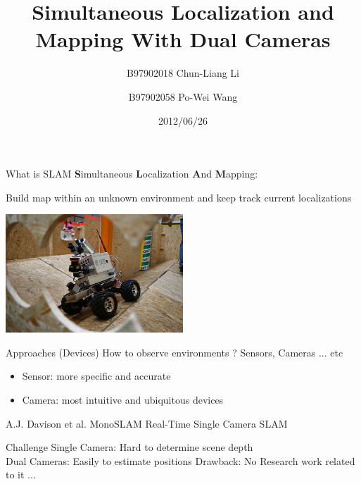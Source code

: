 \documentclass{beamer}
\title{Simultaneous Localization and Mapping With Dual Cameras}
\author{B97902018 Chun-Liang Li \and 
	B97902058 Po-Wei Wang}
\date{2012/06/26}
\begin{document}
	\begin{frame}
		\titlepage
	\end{frame}

	\begin{frame}{What is SLAM}
		\textbf{S}imultaneous \textbf{L}ocalization \textbf{A}nd \textbf{M}apping: 
		
		Build map within an unknown environment and keep track current localizations
		\begin{center}
			\includegraphics[width=0.5\textwidth]{./pics/robot.jpg} 
		\end{center}
	\end{frame}

	\begin{frame}{ Approaches (Devices) }
		How to observe environments ? Sensors, Cameras ... etc\\
		\uncover<2->
		{
			\begin{itemize}
				\item Sensor: more specific and accurate
				\item Camera: most intuitive and ubiquitous devices
			\end{itemize}
		}
		\uncover<3->
		{
			
			A.J. Davison et al. MonoSLAM Real-Time Single Camera SLAM
		}
	\end{frame}
	
	\begin{frame}{Challenge}
		Single Camera: Hard to determine scene depth \\
		\uncover<2->
		{
			Dual Cameras: Easily to estimate positions
		}
		{
			Drawback: No Research work related to it ...
		}
	\end{frame}
	
\end{document}

